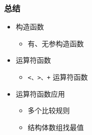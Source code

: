 \begin{frame}[fragile]
    \frametitle{总结}

    \begin{itemize}
        \item 构造函数
        
        \begin{itemize}
            \item 有、无参构造函数
        \end{itemize}

        \item 运算符函数
        
        \begin{itemize}
            \item \lstinline|<、>、+| 运算符函数
        \end{itemize}

        \item 运算符函数应用
        
        \begin{itemize}
            \item 多个比较规则
            \item 结构体数组找最值
        \end{itemize}

    \end{itemize}
            
\end{frame}

